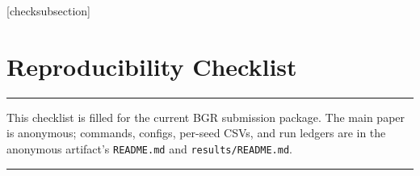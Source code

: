 \documentclass[letterpaper]{article}
\begin{document}
\onecolumn
\fi
\setlength{\leftmargini}{20pt}
\makeatletter\def\@listi{\leftmargin\leftmargini \topsep .5em \parsep .5em \itemsep .5em}
\def\@listii{\leftmargin\leftmarginii \labelwidth\leftmarginii \advance\labelwidth-\labelsep \topsep .4em \parsep .4em \itemsep .4em}
\def\@listiii{\leftmargin\leftmarginiii \labelwidth\leftmarginiii \advance\labelwidth-\labelsep \topsep .4em \parsep .4em \itemsep .4em}\makeatother

\setcounter{secnumdepth}{0}
\renewcommand\thesubsection{\arabic{subsection}}
\renewcommand\labelenumi{\thesubsection.\arabic{enumi}}

[checksubsection]

\newcommand{\checksubsection}[1]{%
  \refstepcounter{checksubsection}%
  \paragraph{\arabic{checksubsection}. #1}%
  \setcounter{checkitem}{0}%
}

\newcommand{\checkitem}{%
  \refstepcounter{checkitem}%
  \item[\arabic{checksubsection}.\arabic{checkitem}.]%
}
\newcommand{\question}[2]{\normalcolor\checkitem #1 #2\par\nobreak\noindent\color{blue}}
\newcommand{\ifyespoints}[1]{\makebox[0pt][l]{\hspace{-15pt}\normalcolor #1}}

\section*{Reproducibility Checklist}

\vspace{1em}
\hrule
\vspace{1em}

This checklist is filled for the current BGR submission package. The main paper is anonymous; commands, configs, per-seed CSVs, and run ledgers are in the anonymous artifact's \texttt{README.md} and \texttt{results/README.md}.

\vspace{1em}
\hrule
\vspace{1em}
\end{document}

